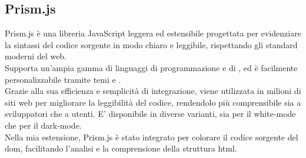 \subsection{Prism.js}
\noindent Prism.js è una libreria JavaScript leggera ed estensibile progettata per evidenziare la sintassi del codice sorgente in modo chiaro e leggibile, rispettando gli standard moderni del web. \\
Supporta un’ampia gamma di linguaggi di programmazione e di , ed è facilmente personalizzabile tramite temi e . \\
Grazie alla sua efficienza e semplicità di integrazione, viene utilizzata in milioni di siti web per migliorare la leggibilità del codice, rendendolo più comprensibile sia a sviluppatori che a utenti. E’ disponibile in diverse varianti, sia per il white-mode che per il dark-mode.\\
Nella mia estensione, Prism.js è stato integrato per colorare il codice sorgente del \acrshort{dom}, facilitando l’analisi e la comprensione della struttura \acrshort{html}.

